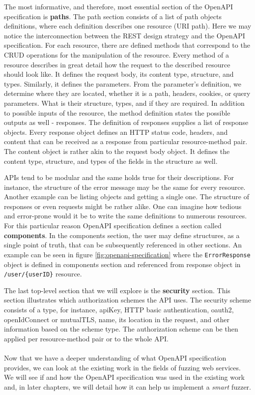 The most informative, and therefore, most essential section of the OpenAPI specification is \textbf{paths}. The path section consists of a list of path objects definitions, where each definition describes one resource (URI path). Here we may notice the interconnection between the REST design strategy and the OpenAPI specification. For each resource, there are defined methods that correspond to the CRUD operations for the manipulation of the resource. Every method of a resource describes in great detail how the request to the described resource should look like. It defines the request body, its content type, structure, and types. Similarly, it defines the parameters. From the parameter's definition, we determine where they are located, whether it is a path, headers, cookies, or query parameters. What is their structure, types, and if they are required. In addition to possible inputs of the resource, the method definition states the possible outputs as well - responses. The definition of responses supplies a list of response objects. Every response object defines an HTTP status code, headers, and content that can be received as a response from particular resource-method pair. The content object is rather akin to the request body object. It defines the content type, structure, and types of the fields in the structure as well.

\label{subsec:components}
APIs tend to be modular and the same holds true for their descriptions. For instance, the structure of the error message may be the same for every resource. Another example can be listing objects and getting a single one. The structure of responses or even requests might be rather alike. One can imagine how tedious and error-prone would it be to write the same definitions to numerous resources. For this particular reason OpenAPI specification defines a section called \textbf{components}. In the components section, the user may define structures, as a single point of truth, that can be subsequently referenced in other sections. An example can be seen in figure \ref{fig:openapi-specification} where the \texttt{ErrorResponse} object is defined in components section and referenced from response object in \texttt{/user/\{userID\}} resource.

The last top-level section that we will explore is the \textbf{security} section. This section illustrates which authorization schemes the API uses. The security scheme consists of a type, for instance, apiKey, HTTP basic authentication, oauth2, openIdConnect or mutualTLS, name, its location in the request, and other information based on the scheme type. The authorization scheme can be then applied per resource-method pair or to the whole API.


\paragraph{}
Now that we have a deeper understanding of what OpenAPI specification provides, we can look at the existing work in the fields of fuzzing web services. We will see if and how the OpenAPI specification was used in the existing work and, in later chapters, we will detail how it can help us implement a \emph{smart} fuzzer.
